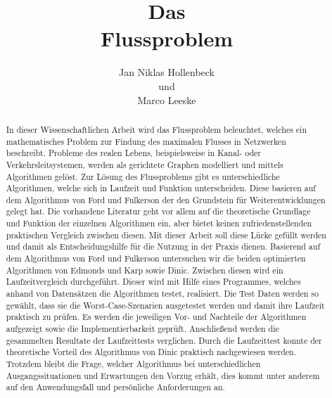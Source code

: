 \documentclass[runningheads,a4paper]{llncs}
\begin{document}
\mainmatter  %

\title{Das \\ Flussproblem}


%
%
\author{Jan Niklas Hollenbeck \\ und \\ Marco Leeske}
\maketitle


\begin{abstract}
In dieser Wissenschaftlichen Arbeit wird das Flussproblem beleuchtet, welches ein mathematisches Problem zur Findung des maximalen Flusses in Netzwerken beschreibt.
 Probleme des realen Lebens, beispielsweise in Kanal- oder Verkehrsleitsystemen, werden als gerichtete Graphen modelliert und mittels Algorithmen gelöst.
 Zur Lösung des Flussproblems gibt es unterschiedliche Algorithmen, welche sich in Laufzeit und Funktion unterscheiden. Diese basieren auf dem Algorithmus von Ford und Fulkerson der den Grundstein für Weiterentwicklungen gelegt hat.
 Die vorhandene Literatur geht vor allem auf die theoretische Grundlage und Funktion der einzelnen Algorithmen ein,  aber bietet keinen zufriedenstellenden praktischen Vergleich zwischen diesen.
 Mit dieser Arbeit soll diese Lücke gefüllt werden und damit als Entscheidungshilfe für die Nutzung in der Praxis dienen.
Basierend auf dem Algorithmus von Ford und Fulkerson untersuchen wir die beiden optimierten Algorithmen von Edmonds und Karp sowie Dinic.
Zwischen diesen wird ein Laufzeitvergleich durchgeführt.
Dieser wird mit Hilfe eines Programmes, welches anhand von Datensätzen die Algorithmen testet, realisiert.
Die Test Daten werden so gewählt, dass sie die Worst-Case-Szenarien ausgetestet werden und damit ihre Laufzeit praktisch zu prüfen.
Es werden die jeweiligen Vor- und Nachteile der Algorithmen aufgezeigt sowie die Implementierbarkeit geprüft. Anschließend werden die gesammelten Resultate der Laufzeittests verglichen.
Durch die Laufzeittest konnte der theoretische Vorteil des Algorithmus von Dinic praktisch nachgewiesen werden.
 Trotzdem bleibt die Frage, welcher Algorithmus bei unterschiedlichen Ausgangssituationen und Erwartungen den Vorzug erhält, dies kommt unter anderem auf den Anwendungsfall und persönliche Anforderungen an.

\end{abstract}
\end{document}

